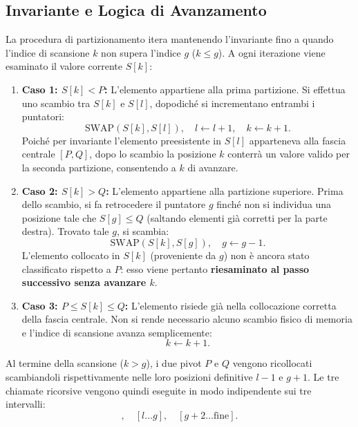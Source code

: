 \FloatBarrier
\subsection{Invariante e Logica di Avanzamento}
\label{subsec:dual-pivot-invariants}

La procedura di partizionamento itera mantenendo l'invariante fino a quando l'indice di scansione $k$ non supera l'indice $g$ ($k \le g$). A ogni iterazione viene esaminato il valore corrente $S[k]$:

\begin{enumerate}
  \item \textbf{Caso 1: $S[k] < P$:}
  L'elemento appartiene alla prima partizione. Si effettua uno scambio tra $S[k]$ e $S[l]$, dopodiché si incrementano entrambi i puntatori:
  \begin{equation}
    \text{SWAP}(S[k], S[l]), \quad l \leftarrow l + 1, \quad k \leftarrow k + 1.
  \end{equation}
  Poiché per invariante l'elemento preesistente in $S[l]$ apparteneva alla fascia centrale $[P, Q]$, dopo lo scambio la posizione $k$ conterrà un valore valido per la seconda partizione, consentendo a $k$ di avanzare.

  \item \textbf{Caso 2: $S[k] > Q$:}
  L'elemento appartiene alla partizione superiore. Prima dello scambio, si fa retrocedere il puntatore $g$ finché non si individua una posizione tale che $S[g] \le Q$ (saltando elementi già corretti per la parte destra). Trovato tale $g$, si scambia:
  \begin{equation}
    \text{SWAP}(S[k], S[g]), \quad g \leftarrow g - 1.
  \end{equation}
  L'elemento collocato in $S[k]$ (proveniente da $g$) non è ancora stato classificato rispetto a $P$: esso viene pertanto \textbf{riesaminato al passo successivo senza avanzare $k$}.

  \item \textbf{Caso 3: $P \le S[k] \le Q$:}
  L'elemento risiede già nella collocazione corretta della fascia centrale. Non si rende necessario alcuno scambio fisico di memoria e l'indice di scansione avanza semplicemente:
  \begin{equation}
    k \leftarrow k + 1.
  \end{equation}
\end{enumerate}

Al termine della scansione ($k > g$), i due pivot $P$ e $Q$ vengono ricollocati scambiandoli rispettivamente nelle loro posizioni definitive $l - 1$ e $g + 1$. Le tre chiamate ricorsive vengono quindi eseguite in modo indipendente sui tre intervalli:
\begin{equation}
  [\text{inizio} \dots l - 2], \quad [l \dots g], \quad [g + 2 \dots \text{fine}].
\end{equation}

